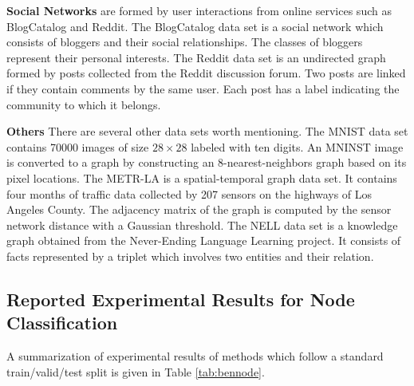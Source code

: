 	\vspace{2mm}\noindent\textbf{Social Networks}
	are formed by user interactions from online services such as BlogCatalog and Reddit. The BlogCatalog data set is a social network which consists of bloggers and their social relationships.  The classes of bloggers represent their personal interests.  The Reddit data set is an undirected graph formed by posts collected from the Reddit discussion forum. Two posts are linked if they contain comments by the same user. Each post has a label indicating the community to which it belongs. 
	
	\vspace{2mm}\noindent\textbf{Others}
	There are several other data sets worth mentioning. The MNIST data set contains  70000 images of size $28\times 28$ labeled with ten digits. An MNINST image is converted to a graph by constructing an 8-nearest-neighbors graph based on its pixel locations.
	The METR-LA is a spatial-temporal graph data set. It contains four months of traffic data collected by 207 sensors on the highways of Los Angeles County. The adjacency matrix of the graph is computed by the sensor network distance with a Gaussian threshold. 
	The NELL data set is a knowledge graph obtained from the Never-Ending Language Learning project. It consists of facts represented by a triplet which involves two entities and their relation.

\subsection{Reported Experimental Results for Node Classification}
A summarization of experimental results of methods which follow a standard train/valid/test split is given in Table \ref{tab:bennode}.

